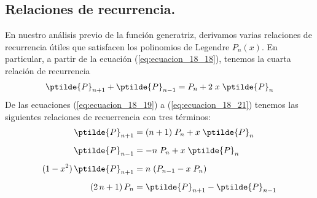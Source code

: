 \subsection{Relaciones de recurrencia.}
En nuestro análisis previo de la función generatriz, derivamos varias relaciones de recurrencia útiles que satisfacen los polinomios de Legendre $P_{n} (x)$. En particular, a partir de la ecuación (\ref{eq:ecuacion_18_18}), tenemos la cuarta relación de recurrencia
\begin{align*}
\ptilde{P}_{n+1} + \ptilde{P}_{n-1} =  P_{n} + 2 \; x \; \ptilde{P}_{n}
\end{align*}
De las ecuaciones (\ref{eq:ecuacion_18_19}) a (\ref{eq:ecuacion_18_21}) tenemos las siguientes relaciones de recuerrencia con tres términos:
\begin{align*}
\ptilde{P}_{n+1} &= (n+1) \; P_{n} + x \; \ptilde{P}_{n} \\[0.5em]
\ptilde{P}_{n-1} &= -n \; P_{n} + x \; \ptilde{P}_{n} \\[0.5em]
(1 - x^{2}) \, \ptilde{P}_{n+1} &= n \; (P_{n-1} - x \; P_{n}) \\[0.5em]
(2 \, n + 1) \, P_{n} &= \ptilde{P}_{n+1} - \ptilde{P}_{n-1}
\end{align*}
